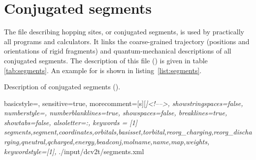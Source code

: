 \section{Conjugated segments}
\label{sec:xmlsegments}
The file describing hopping sites, or conjugated segments, is used by practically all programs and calculators. It links the coarse-grained trajectory (positions and orientations of rigid fragments) and quantum-mechanical descriptions of all conjugated segments. The description of this \xml file (\xmlsegments) is given in table \ref{tab:segments}. An example for \dcvt is shown in listing~\ref{list:segments}.
%
\begin{table}[h]
\caption{Description of conjugated segments (\xmlsegments).} 
\label{tab:segments}
\end{table}
%
 {
   basicstyle=\ttfamily\scriptsize,
   sensitive=true,
   morecomment=[s][\color{gray}\rmfamily\itshape]{<!--}{-->}, 
   showstringspaces=false,
   numberstyle=\scriptsize,
   numberblanklines=true,
   showspaces=false,
   breaklines=true,
   showtabs=false,
   alsoletter={:},
   keywords = [1]
{segments,segment,coordinates,orbitals,basisset,torbital,reorg_charging,reorg_discharging,qneutral,qcharged,energy,beadconj,molname,name,map,weights},   
  keywordstyle={[1]\color{blue}},
}
%
%
{./input/dcv2t/segments.xml}


